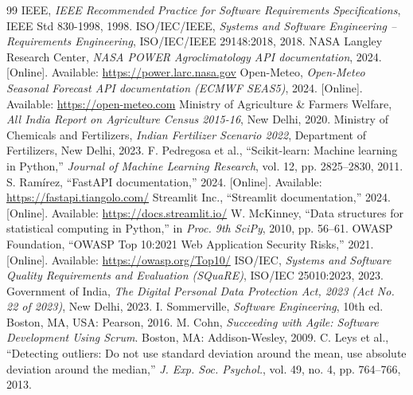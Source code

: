 \documentclass[11pt,a4paper]{report}
\begin{document}
\begin{thebibliography}{99}
 IEEE, \emph{IEEE Recommended Practice for Software Requirements Specifications}, IEEE Std 830-1998, 1998.
 ISO/IEC/IEEE, \emph{Systems and Software Engineering -- Requirements Engineering}, ISO/IEC/IEEE 29148:2018, 2018.
 NASA Langley Research Center, \emph{NASA POWER Agroclimatology API documentation}, 2024. [Online]. Available: \url{https://power.larc.nasa.gov}
 Open-Meteo, \emph{Open-Meteo Seasonal Forecast API documentation (ECMWF SEAS5)}, 2024. [Online]. Available: \url{https://open-meteo.com}
 Ministry of Agriculture \& Farmers Welfare, \emph{All India Report on Agriculture Census 2015-16}, New Delhi, 2020.
 Ministry of Chemicals and Fertilizers, \emph{Indian Fertilizer Scenario 2022}, Department of Fertilizers, New Delhi, 2023.
 F. Pedregosa et al., ``Scikit-learn: Machine learning in Python,'' \emph{Journal of Machine Learning Research}, vol. 12, pp. 2825--2830, 2011.
 S. Ram\'irez, ``FastAPI documentation,'' 2024. [Online]. Available: \url{https://fastapi.tiangolo.com/}
 Streamlit Inc., ``Streamlit documentation,'' 2024. [Online]. Available: \url{https://docs.streamlit.io/}
 W. McKinney, ``Data structures for statistical computing in Python,'' in \emph{Proc. 9th SciPy}, 2010, pp. 56--61.
 OWASP Foundation, ``OWASP Top 10:2021 Web Application Security Risks,'' 2021. [Online]. Available: \url{https://owasp.org/Top10/}
 ISO/IEC, \emph{Systems and Software Quality Requirements and Evaluation (SQuaRE)}, ISO/IEC 25010:2023, 2023.
 Government of India, \emph{The Digital Personal Data Protection Act, 2023 (Act No. 22 of 2023)}, New Delhi, 2023.
 I. Sommerville, \emph{Software Engineering}, 10th ed. Boston, MA, USA: Pearson, 2016.
 M. Cohn, \emph{Succeeding with Agile: Software Development Using Scrum}. Boston, MA: Addison-Wesley, 2009.
 C. Leys et al., ``Detecting outliers: Do not use standard deviation around the mean, use absolute deviation around the median,'' \emph{J. Exp. Soc. Psychol.}, vol. 49, no. 4, pp. 764--766, 2013.

\end{thebibliography}

\newpage
\end{document}
